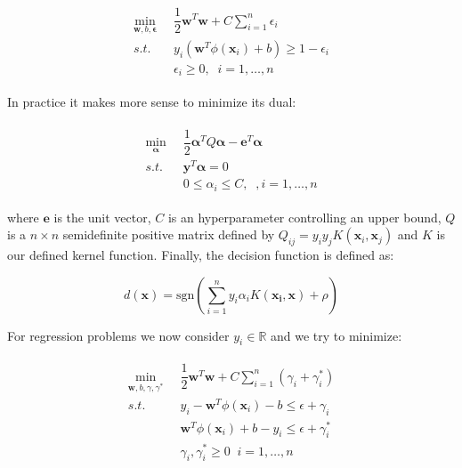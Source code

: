\documentclass[10pt,a4paper,twoside]{book}
\begin{document}
\begin{align}
\begin{split}
\min_{\boldsymbol{w}, b, \boldsymbol{\epsilon}}\;\; &\dfrac{1}{2}\boldsymbol{w}^T \boldsymbol{w} + C \sum_{i=1}^n \epsilon_i \\
 s.t.\;\; & y_i(\boldsymbol{w}^T\phi(\boldsymbol{x}_i) + b) \geq 1 - \epsilon_i\\
\;&\epsilon_i \geq 0,\;\; i=1,\dots,n
\end{split}
\end{align}

In practice it makes more sense to minimize its dual:

\begin{align}\label{svc}
\begin{split}
\min_{\boldsymbol{\alpha}}\;\; &\dfrac{1}{2} \boldsymbol{\alpha}^T Q \boldsymbol{\alpha} - \boldsymbol{e}^T\boldsymbol{\alpha}\\
s.t. \;\; & \boldsymbol{y}^T\boldsymbol{\alpha} = 0 \\
\;& 0 \leq \alpha_i \leq C, \;\;, i=1,\dots,n
\end{split}
\end{align}

where $\boldsymbol{e}$ is the unit vector, $C$ is an hyperparameter controlling an upper bound, $Q$ is a $n\times n$ semidefinite positive matrix defined by $Q_{ij} = y_i y_j K(\boldsymbol{x}_i, \boldsymbol{x}_j)$ and $K$ is our defined kernel function. Finally, the decision function is defined as:

\begin{equation}
d(\boldsymbol{x}) = \mathrm{sgn}\left(\sum_{i=1}^n y_i \alpha_i K(\boldsymbol{x_i}, \boldsymbol{x}) + \rho \right)
\end{equation}

For regression problems we now consider $y_i \in \mathbb{R}$ and we try to minimize:

\begin{align}
\begin{split}
\min_{\boldsymbol{w}, b, \gamma, \gamma^*}\;\; & \dfrac{1}{2}\boldsymbol{w}^T\boldsymbol{w} + C \sum_{i=1}^n(\gamma_i + \gamma_i^*)\\
s.t. \;\; & y_i - \boldsymbol{w}^T \phi(\boldsymbol{x}_i) - b \leq \epsilon + \gamma_i\\
\;\;& \boldsymbol{w}^T\phi(\boldsymbol{x}_i) + b - y_i \leq \epsilon + \gamma_i^*\\
\;\;& \gamma_i, \gamma_i^* \geq 0 \;\; i=1,\dots,n 
\end{split}
\end{align}
\end{document}

